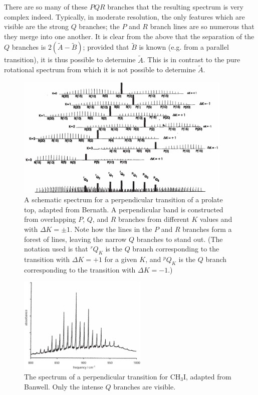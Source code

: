 \documentclass{article}
\theoremstyle{plain}\theoremheaderfont{\normalfont\itshape}\theorembodyfont{\rmfamily}\theoremseparator{.}\newtheorem*{rem}{Remark}\newtheorem*{ex}{Example}\newtheorem*{proof}{Proof}\newtheorem*{altp}{Alternative proof}
\theoremstyle{plain}\theoremheaderfont{\normalfont\bfseries}\theorembodyfont{\rmfamily}\theoremseparator{.}\newtheorem{thm}{Theorem}[section]\newtheorem{lem}[thm]{Lemma}\newtheorem{prop}[thm]{Proposition}\newtheorem*{cor}{Corollary}\newtheorem{defn}[thm]{Definition}\newtheorem{clm}[thm]{Claim}\newtheorem{clminproof}{Claim}\newtheorem{pos}{Postulate}[section]
\theoremstyle{break}\theoremheaderfont{\normalfont\itshape}\theorembodyfont{\rmfamily}\theoremseparator{.\medskip}\newtheorem*{proofskip}{Proof}\newtheorem*{exs}{Examples}\newtheorem*{rems}{Remarks}
\theoremstyle{break}\theoremheaderfont{\normalfont\bfseries}\theorembodyfont{\rmfamily}\theoremseparator{.\medskip}\newtheorem{lemskip}[thm]{Lemma}\newtheorem{defnskip}[thm]{Definition}\newtheorem{propskip}[thm]{Proposition}\newtheorem{thmskip}[thm]{Theorem}
\numberwithin{equation}{section}
\begin{document}
    There are so many of these \(PQR\) branches that the resulting spectrum is very complex indeed. Typically, in moderate resolution, the only features which are visible are the strong \(Q\) branches; the \(P\) and \(R\) branch lines are so numerous that they merge into one another. It is clear from the above that the separation of the \(Q\) branches is \(2(\tilde{A}-\tilde{B})\); provided that \(\tilde{B}\) is known (e.g. from a parallel transition), it is thus possible to determine \(\tilde{A}\). This is in contrast to the pure rotational spectrum from which it is not possible to determine \(\tilde{A}\).

    \begin{figure}
        \centering
        \includegraphics[width=0.92\textwidth]{prolate_top_perpendicular.png}
        \caption{A schematic spectrum for a perpendicular transition of a prolate top, adapted from Bernath. A perpendicular band is constructed from overlapping \(P\), \(Q\), and \(R\) branches from different \(K\) values and with \(\Delta K=\pm 1\). Note how the lines in the \(P\) and \(R\) branches form a forest of lines, leaving the narrow \(Q\) branches to stand out. (The notation used is that \(^rQ_K\) is the \(Q\) branch corresponding to the transition with \(\Delta K=+1\) for a given \(K\), and \(^pQ_K\) is the \(Q\) branch corresponding to the transition with \(\Delta K=-1\).)}
    \end{figure}

    \begin{figure}
        \centering
        \includegraphics[width=0.55\textwidth]{CH3I_perpendicular.png}
        \caption{The spectrum of a perpendicular transition for \(\mathrm{CH_3I}\), adapted from Banwell. Only the intense \(Q\) branches are visible.}
    \end{figure}
\end{document}
